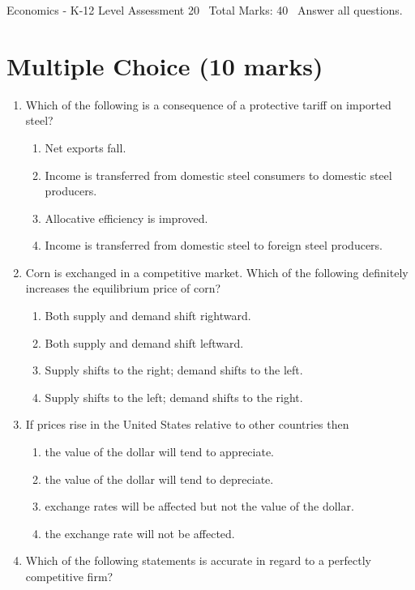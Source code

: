 \documentclass[12pt]{article}
\begin{document}
\begin{center}
Economics - K-12 Level Assessment 20 \
Total Marks: 40 \
Answer all questions.
\end{center}

\section*{Multiple Choice (10 marks)}
\begin{enumerate}[label=\arabic*.]
\item Which of the following is a consequence of a protective tariff on imported steel?
\begin{enumerate}[label=(\alph*)]
    \item Net exports fall.
    \item Income is transferred from domestic steel consumers to domestic steel producers.
    \item Allocative efficiency is improved.
    \item Income is transferred from domestic steel to foreign steel producers.
\end{enumerate}
\item Corn is exchanged in a competitive market. Which of the following definitely increases the equilibrium price of corn?
\begin{enumerate}[label=(\alph*)]
    \item Both supply and demand shift rightward.
    \item Both supply and demand shift leftward.
    \item Supply shifts to the right; demand shifts to the left.
    \item Supply shifts to the left; demand shifts to the right.
\end{enumerate}
\item If prices rise in the United States relative to other countries then
\begin{enumerate}[label=(\alph*)]
    \item the value of the dollar will tend to appreciate.
    \item the value of the dollar will tend to depreciate.
    \item exchange rates will be affected but not the value of the dollar.
    \item the exchange rate will not be affected.
\end{enumerate}
\item Which of the following statements is accurate in regard to a perfectly competitive firm?

\end{enumerate}
\end{document}
